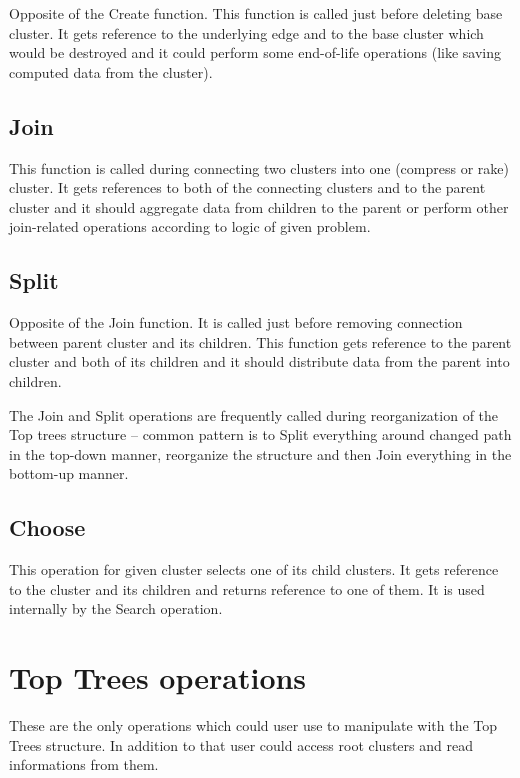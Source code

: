 Opposite of the Create function. This function is called just before deleting
base cluster. It gets reference to the underlying edge and to the base cluster
which would be destroyed and it could perform some end-of-life operations (like
saving computed data from the cluster).

\subsection{Join}

This function is called during connecting two clusters into one (compress or rake)
cluster. It gets references to both of the connecting clusters and to the parent
cluster and it should aggregate data from children to the parent or perform other
join-related operations according to logic of given problem.

\subsection{Split}

Opposite of the Join function. It is called just before removing connection
between parent cluster and its children. This function gets reference to the
parent cluster and both of its children and it should distribute data from the
parent into children.

The Join and Split operations are frequently called during reorganization of the
Top trees structure -- common pattern is to Split everything around changed path
in the top-down manner, reorganize the structure and then Join everything in the
bottom-up manner.

\subsection{Choose}

This operation for given cluster selects one of its child clusters. It gets
reference to the cluster and its children and returns reference to one of them.
It is used internally by the {\I Search} operation.



\section{Top Trees operations}

These are the only operations which could user use to manipulate with the Top
Trees structure. In addition to that user could access root clusters and read
informations from them.

